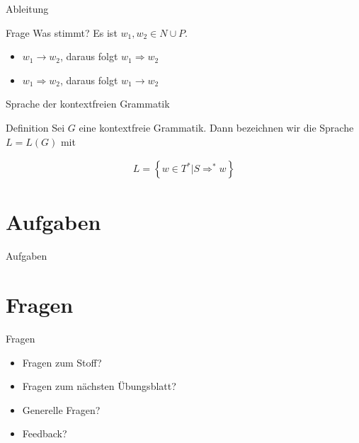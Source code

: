 	\begin{frame}{Ableitung}
    	\begin{block}{Frage}
        	Was stimmt? Es ist $w_1, w_2 \in N \cup P$.
        	
        	\begin{itemize}
            	\item $w_1 \rightarrow w_2$, daraus folgt $w_1 \Rightarrow w_2$
            	\item $w_1 \Rightarrow w_2$, daraus folgt $w_1 \rightarrow w_2$
        	\end{itemize}
    	\end{block}
	\end{frame}

	\begin{frame}{Sprache der kontextfreien Grammatik}
    	\begin{block}{Definition}
        	Sei $G$ eine kontextfreie Grammatik. 
        	Dann bezeichnen wir die Sprache $L = L\left(G\right)$ mit 
        
        	\begin{align*}
            	L = \left\{ w\in T^* \big| S \Rightarrow^* w\right\}
        	\end{align*}
    	\end{block}
    
    	\pause
	\end{frame}	
	
	
	
	\section{Aufgaben}
	\begin{frame}{Aufgaben}
		
	\end{frame}
	
	
	
	\section{Fragen}
	\begin{frame} {Fragen}
		\begin{itemize}
			\item Fragen zum Stoff?
			\item Fragen zum n\"achsten \"Ubungsblatt?
			\item Generelle Fragen?
			\item Feedback?
		\end{itemize}
	\end{frame}

